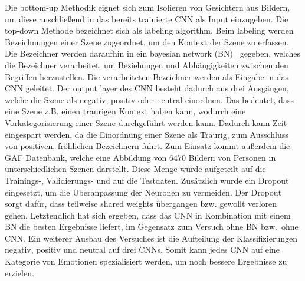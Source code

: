 Die bottom-up Methodik eignet sich zum Isolieren von Gesichtern aus Bildern, um diese anschließend in das bereits trainierte CNN als Input einzugeben. Die top-down Methode bezeichnet sich als labeling algorithm. Beim labeling werden Bezeichnungen einer Szene zugeordnet, um den Kontext der Szene zu erfassen.\\Die Bezeichner werden daraufhin in ein bayesian network (BN)~\cite{wildemotionrec} gegeben, welches die Bezeichner verarbeitet, um Beziehungen und Abhängigkeiten zwischen den Begriffen herzustellen. Die verarbeiteten Bezeichner werden als Eingabe in das CNN geleitet. Der output layer des CNN besteht dadurch aus drei Ausgängen, welche die Szene als negativ, positiv oder neutral einordnen. Das bedeutet, dass eine Szene z.B. einen traurigen Kontext haben kann, wodurch eine Vorkategorisierung einer Szene durchgeführt werden kann. Da\-durch kann Zeit eingespart werden, da die Einordnung einer Szene als Traurig, zum Ausschluss von positiven, fröhlichen Bezeichnern führt. Zum Einsatz kommt außerdem die GAF Datenbank, welche eine Abbildung von 6470 Bildern von Personen in unterschiedlichen Szenen darstellt. Diese Menge wurde aufgeteilt auf die Trainings-, Validierungs- und auf die Testdaten. Zusätzlich wurde ein Dropout eingesetzt, um die Überanpassung der Neuronen zu vermeiden. Der Dropout sorgt dafür, dass teilweise shared weights übergangen bzw. gewollt verloren gehen. Letztendlich hat sich ergeben, dass das CNN in Kombination mit einem BN die besten Ergebnisse liefert, im Gegensatz zum Versuch ohne BN bzw.~ohne CNN. Ein weiterer Ausbau des Versuches ist die Aufteilung der Klassifizierungen negativ, positiv und neutral auf drei CNNs. Somit kann jedes CNN auf eine Kategorie von Emotionen spezialisiert werden, um noch bessere Ergebnisse zu erzielen.

